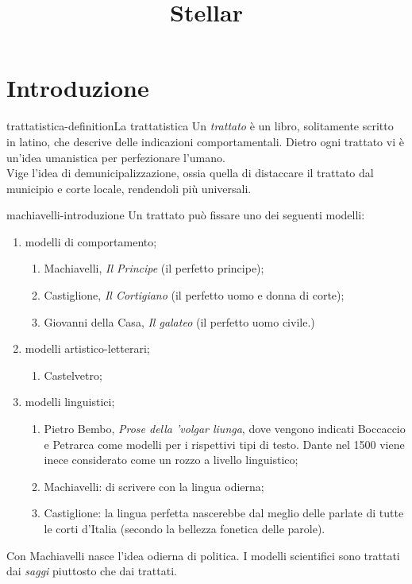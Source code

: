 \documentclass[preview]{standalone}
\begin{document}
\title{Stellar}
\genpage

\section{Introduzione}

\begin{snippetdefinition}{trattatistica-definition}{La trattatistica}
    Un \textit{trattato} è un libro, solitamente scritto in latino,
    che descrive delle indicazioni comportamentali.
    Dietro ogni trattato vi è un'idea umanistica per perfezionare l'umano. \\
    Vige l'idea di demunicipalizzazione, ossia quella di distaccare
    il trattato dal municipio e corte locale, rendendoli più universali.
\end{snippetdefinition}

\begin{snippet}{machiavelli-introduzione}
    Un trattato può fissare uno dei seguenti modelli:
    \begin{enumerate}
        \item modelli di comportamento;
        \begin{enumerate}
            \item Machiavelli, \textit{Il Principe} (il perfetto principe);
            \item Castiglione, \textit{Il Cortigiano} (il perfetto uomo e donna di corte);
            \item Giovanni della Casa, \textit{Il galateo} (il perfetto uomo civile.)
        \end{enumerate}
        \item modelli artistico-letterari;
        \begin{enumerate}
            \item Castelvetro;
        \end{enumerate}
        \item modelli linguistici;
        \begin{enumerate}
            \item Pietro Bembo, \textit{Prose della 'volgar liunga},
                dove vengono indicati Boccaccio e Petrarca come modelli per i rispettivi tipi di testo.
                Dante nel 1500 viene inece considerato come un rozzo a livello linguistico;
            \item Machiavelli: di scrivere con la lingua odierna;
            \item Castiglione: la lingua perfetta nascerebbe dal
                meglio delle parlate di tutte le corti d'Italia (secondo la bellezza fonetica delle parole).
        \end{enumerate}
    \end{enumerate}
    
    Con Machiavelli nasce l'idea odierna di politica.
    I modelli scientifici sono trattati dai \textit{saggi} piuttosto che dai trattati.
\end{snippet}
\end{document}
